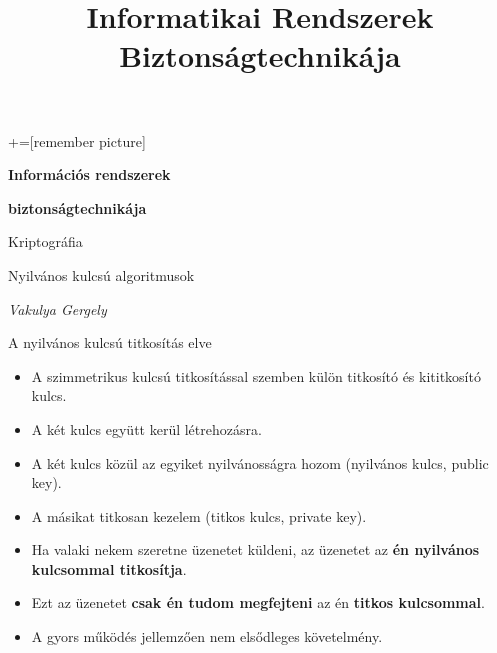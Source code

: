 \documentclass[12 pt]{beamer}
\author{}
\title{Informatikai Rendszerek Biztonságtechnikája}
\institute{}
\date{}
\begin{document}
+=[remember picture]

{

  \begin{frame}[c]
    \begin{center}

      \Large
      \textbf{Információs rendszerek}

      \textbf{biztonságtechnikája}

      \qquad

      Kriptográfia

      Nyilvános kulcsú algoritmusok

      \qquad

      \textit{Vakulya Gergely}

    \end{center}
  \end{frame}
}


\begin{frame}{A nyilvános kulcsú titkosítás elve}
    \begin{itemize}
      \item{A szimmetrikus kulcsú titkosítással szemben külön titkosító és kititkosító kulcs.}
      \item{A két kulcs együtt kerül létrehozásra.}
      \item{A két kulcs közül az egyiket nyilvánosságra hozom (nyilvános kulcs, public key).}
      \item{A másikat titkosan kezelem (titkos kulcs, private key).}
      \item{Ha valaki nekem szeretne üzenetet küldeni, az üzenetet az \textbf{én nyilvános kulcsommal titkosítja}.}
      \item{Ezt az üzenetet \textbf{csak én tudom megfejteni} az én \textbf{titkos kulcsommal}.}
      \item{A gyors működés jellemzően nem elsődleges követelmény.}
    \end{itemize}
\end{frame}
\end{document}
